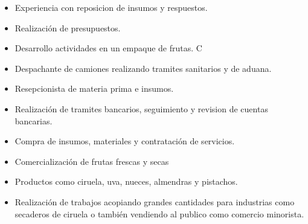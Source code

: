 \documentclass[10pt,a4paper,ragged2e,withhyper]{altacv}
\begin{document}
\begin{paracol}{2}

\begin{itemize}
\item Experiencia con reposicion de insumos y respuestos.
\item Realización de presupuestos.
\end{itemize}

\divider

\begin{itemize}
\item Desarrollo actividades en un empaque de frutas. C
\item Despachante de camiones realizando tramites sanitarios y de aduana. \item Resepcionista de materia prima e insumos. 
\end{itemize}

\divider

\begin{itemize}
\item Realización de tramites bancarios, seguimiento y revision de cuentas bancarias. 
\item Compra de insumos, materiales  y contratación de servicios. 
\end{itemize}

\divider

\begin{itemize}
\item Comercialización de frutas frescas y secas
\item Productos como ciruela, uva, nueces, almendras y pistachos.
\item Realización de trabajos acopiando grandes cantidades para industrias como secaderos de ciruela o también vendiendo al publico como comercio minorista. 
\end{itemize}


\medskip



\end{paracol}
\end{document}
